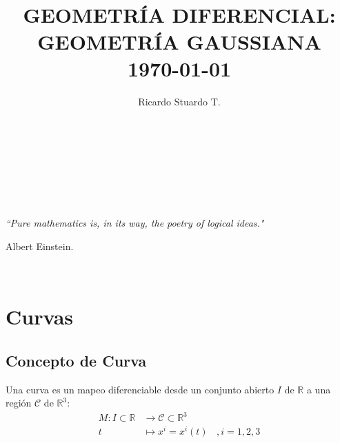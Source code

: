 \documentclass[letterpaper,11pt,twoside]{report}
\title{	\normalsize \textsc{} 	
	\\[2.0cm]							
	\HRule{1pt} \\						
	\LARGE \textbf{\uppercase{Geometr\'ia Diferencial: \\ Geometr\'ia Gaussiana}}	
	\HRule{1pt} \\ [0.5cm]		
	\normalsize \today}
\author{Ricardo Stuardo T.}
\makeatletter
\def\printtitle{						
	{\centering \@title\par}}
\def\printauthor{				
	{\centering \large \@author}}
\makeatother
\begin{document}
	
	\thispagestyle{empty}	
	

\printtitle					
\vfill
\begin{flushright}
	\printauthor
\end{flushright}

\newpage
	\thispagestyle{empty}
	\ \\

\newpage

	\thispagestyle{empty}
	\tableofcontents

\newpage
	\thispagestyle{empty}
	\ \\


\newpage

	\thispagestyle{empty}

	\bigskip \
	\bigskip \
	\bigskip \
	\bigskip \
	\bigskip \
	\bigskip \	
	\bigskip \
	\bigskip \
	\bigskip \	
	\bigskip \
	\bigskip \
	\bigskip \
	\bigskip \
	\bigskip \
	\bigskip \	
	\bigskip \
	\bigskip \
	\bigskip \
	
	\begin{center}
		\emph{\textquotedblleft Pure mathematics is, in its way, the poetry of logical ideas."}
	\end{center}
	
	\begin{flushright}
		Albert Einstein.
	\end{flushright}

\newpage
	\thispagestyle{empty}
	\ \\

\newpage
	\setcounter{page}{1}

\chapter{Curvas}
	
\section{Concepto de Curva}

Una curva es un mapeo diferenciable desde un conjunto abierto $I$ de $\mathbb{R}$ a una regi\'on $\mathcal{C}$ de $\mathbb{R}^{3}$:
	 \begin{align*}
		M: I \subset \mathbb{R} &\longrightarrow \mathcal{C} \subset \mathbb{R}^{3} \\
		   t &\longmapsto x^{i} = x^{i} (t)  \ \ \ \ , i = 1,2,3
	 \end{align*}
\end{document}
